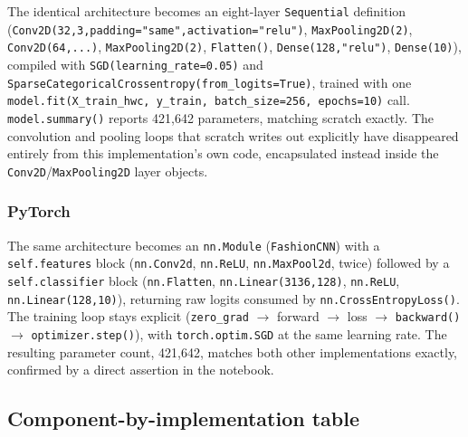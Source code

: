 \documentclass[11pt]{article}
\newcommand{\code}[1]{\texttt{#1}}
\begin{document}
The identical architecture becomes an eight-layer \code{Sequential}
definition (\code{Conv2D(32,3,padding="same",activation="relu")},
\code{MaxPooling2D(2)}, \code{Conv2D(64,...)}, \code{MaxPooling2D(2)},
\code{Flatten()}, \code{Dense(128,"relu")}, \code{Dense(10)}), compiled with
\code{SGD(learning\_rate=0.05)} and
\code{SparseCategoricalCrossentropy(from\_logits=True)}, trained with one
\code{model.fit(X\_train\_hwc, y\_train, batch\_size=256, epochs=10)} call.
\code{model.summary()} reports 421,642 parameters, matching scratch exactly.
The convolution and pooling loops that scratch writes out explicitly have
disappeared entirely from this implementation's own code, encapsulated
instead inside the \code{Conv2D}/\code{MaxPooling2D} layer objects.

\subsubsection{PyTorch}

The same architecture becomes an \code{nn.Module} (\code{FashionCNN}) with a
\code{self.features} block (\code{nn.Conv2d}, \code{nn.ReLU},
\code{nn.MaxPool2d}, twice) followed by a \code{self.classifier} block
(\code{nn.Flatten}, \code{nn.Linear(3136,128)}, \code{nn.ReLU},
\code{nn.Linear(128,10)}), returning raw logits consumed by
\code{nn.CrossEntropyLoss()}. The training loop stays explicit
(\code{zero\_grad} $\to$ forward $\to$ loss $\to$ \code{backward()} $\to$
\code{optimizer.step()}), with \code{torch.optim.SGD} at the same learning
rate. The resulting parameter count, 421,642, matches both other
implementations exactly, confirmed by a direct assertion in the notebook.

\subsection{Component-by-implementation table}
\end{document}
